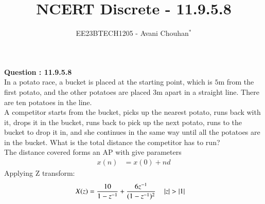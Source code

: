 \documentclass[journal,12pt,twocolumn]{IEEEtran}
\theoremstyle{remark}
\begin{document}

\vspace{3cm}

\title{NCERT Discrete - 11.9.5.8}
\author{EE23BTECH1205 - Avani Chouhan$^{*}$%
}
\maketitle
\newpage
\bigskip

\renewcommand{\thefigure}{\theenumi}
\renewcommand{\thetable}{\theenumi}

\vspace{3cm}
\textbf{Question : 11.9.5.8} \\
In a potato race, a bucket is placed at the starting point, which is $5$m from the first potato, and the other potatoes are placed $3$m apart in a straight line. There are ten potatoes in the line.\\
A competitor starts from the bucket, picks up the nearest potato, runs back with it, drops it in the bucket, runs back to pick up the next potato, runs to the bucket to drop it in, and she continues in the same way until all the potatoes are in the bucket. What is the total distance the competitor has to run?\\

\solution
The distance covered forms an AP with give parameters \\
  
 \begin{align}
 x(n) &= x(0)+nd
 \end{align}
Applying Z transform:
\begin{align}
    X(z) &=\frac{10}{1-z^{-1}} + \frac{6z^{-1}}{(1-z^{-1})^2} 
    \quad \left\vert z\right\vert>\left\vert1\right\vert
\end{align}
\end{document}
